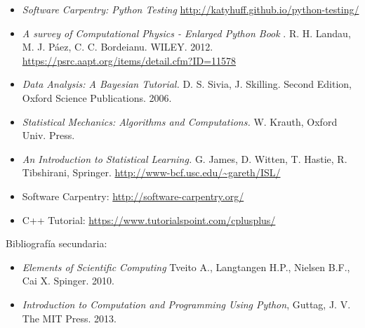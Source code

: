 \documentclass[letterpaper,10pt,onecolumn]{article}
\begin{document}
\begin{itemize}
\item
\textit{Software Carpentry: Python Testing}
\url{http://katyhuff.github.io/python-testing/}

\item
\textit{A survey of Computational Physics - Enlarged Python Book}
. R. H. Landau, M. J. P\'aez, C. C. Bordeianu. WILEY. 2012.
\url{https://psrc.aapt.org/items/detail.cfm?ID=11578}

\item
\textit{Data Analysis: A Bayesian Tutorial.} D. S. Sivia,
J. Skilling. Second Edition, Oxford Science Publications. 2006.

\item 
\textit{Statistical Mechanics: Algorithms and Computations.}
W. Krauth, Oxford Univ. Press. 

\item
\textit{An Introduction to Statistical Learning.} G. James, D. Witten,
T. Hastie, R. Tibshirani,
Springer. \url{http://www-bcf.usc.edu/~gareth/ISL/} 


\item Software Carpentry: \url{http://software-carpentry.org/}
\item C++ Tutorial: \url{https://www.tutorialspoint.com/cplusplus/}
\end{itemize}

\noindent\normalsize Bibliograf\'ia secundaria:
\begin{itemize}
\item
\textit{Elements of Scientific Computing}
Tveito A., Langtangen H.P., Nielsen B.F., Cai X. Spinger. 2010.


\item 
\textit{Introduction to Computation and Programming Using Python},
Guttag, J. V. The MIT Press. 2013.

\end{itemize}
\end{document}
